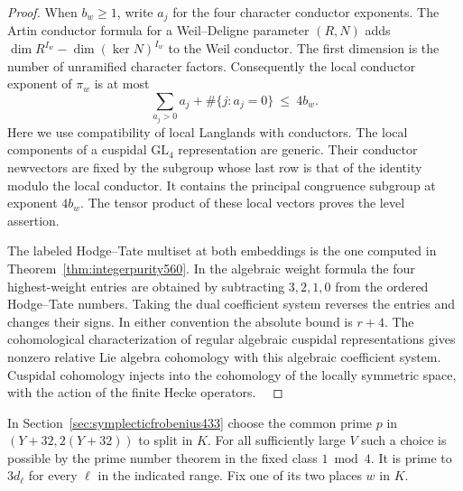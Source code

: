 \documentclass[a4paper,11pt]{article}
\theoremstyle{definition}
\theoremstyle{remark}
\numberwithin{equation}{section}
\begin{document}
\begin{proof}
When \(b_w\ge1\), write \(a_j\) for the four character conductor
exponents. The Artin conductor formula for a Weil--Deligne
parameter \((R,N)\) adds
\(\dim R^{I_w}-\dim(\ker N)^{I_w}\) to the Weil conductor.
The first dimension is the number of unramified character
factors. Consequently the local conductor exponent of \(\pi_w\)
is at most
\[
       \sum_{a_j>0}a_j+\#\{j:a_j=0\}\ \le\ 4b_w .
\]
Here we use compatibility of local Langlands with conductors.
The local components of a cuspidal \(\mathrm{GL}_4\) representation
are generic. Their conductor newvectors are fixed by the subgroup
whose last row is that of the identity modulo the local
conductor. It contains the principal congruence subgroup at
exponent \(4b_w\). The tensor product of these local vectors
proves the level assertion.~\cite{XII-IX-newvector561}

The labeled Hodge--Tate multiset at both embeddings is the one
computed in Theorem~\ref{thm:integerpurity560}. In the algebraic
weight formula the four highest-weight entries are obtained by
subtracting \(3,2,1,0\) from the ordered Hodge--Tate numbers.
Taking the dual coefficient system reverses the entries and
changes their signs. In either convention the absolute bound
is \(r+4\). The cohomological characterization of regular
algebraic cuspidal representations gives nonzero relative Lie
algebra cohomology with this algebraic coefficient system.
Cuspidal cohomology injects into the cohomology of the locally
symmetric space, with the action of the finite Hecke operators.
~\cite{XII-IX-clozel561,XII-IX-franke561}
\end{proof}

In Section~\ref{sec:symplecticfrobenius433} choose the common
prime \(p\) in \((Y+32,2(Y+32))\) to split in \(K\). For all
sufficiently large \(V\) such a choice is possible by the prime
number theorem in the fixed class \(1\bmod 4\). It is prime to
\(3d_\ell\) for every \(\ell\) in the indicated range. Fix
one of its two places \(w\) in \(K\).
\end{document}
